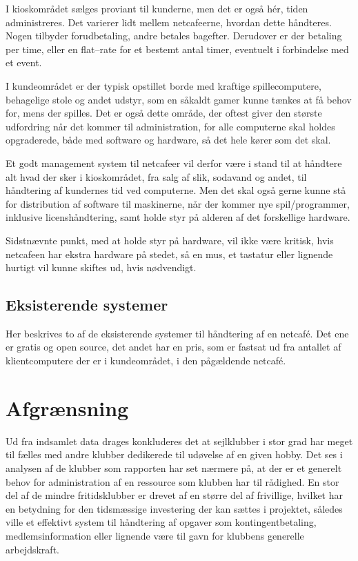 I kioskområdet sælges proviant til kunderne, men det er også hér, tiden administreres. Det varierer lidt
mellem netcafeerne, hvordan dette håndteres. Nogen tilbyder forudbetaling, andre betales bagefter. Derudover
er der betaling per time, eller en flat--rate for et bestemt antal timer, eventuelt i forbindelse med et
event.

I kundeområdet er der typisk opstillet borde med kraftige spillecomputere, behagelige stole og andet udstyr,
som en såkaldt gamer kunne tænkes at få behov for, mens der spilles. Det er også dette område, der oftest
giver den største udfordring når det kommer til administration, for alle computerne skal holdes opgraderede,
både med software og hardware, så det hele kører som det skal.

Et godt management system til netcafeer vil derfor være i stand til at håndtere alt hvad der sker i
kioskområdet, fra salg af slik, sodavand og andet, til håndtering af kundernes tid ved computerne. Men det
skal også gerne kunne stå for distribution af software til maskinerne, når der kommer nye spil/programmer,
inklusive licenshåndtering, samt holde styr på alderen af det forskellige hardware.

Sidstnævnte punkt, med at holde styr på hardware, vil ikke være kritisk, hvis netcafeen har ekstra hardware på
stedet, så en mus, et tastatur eller lignende hurtigt vil kunne skiftes ud, hvis nødvendigt.


\subsection{Eksisterende systemer}\label{sec:eksisterende-systemer}

Her beskrives to af de eksisterende systemer til håndtering af en netcafé. Det ene er gratis og open source, det andet har en pris, som er fastsat ud fra antallet af klientcomputere der er i kundeområdet, i den pågældende netcafé.

\section{Afgrænsning} \label{IntAfgrænsning}
Ud fra indsamlet data drages konkluderes det at sejlklubber i stor grad har meget til fælles med andre klubber dedikerede til udøvelse af en given hobby. Det ses i analysen af de klubber som rapporten har set nærmere på, at der er et generelt behov for administration af en ressource som klubben har til rådighed. En stor del af de mindre fritidsklubber er drevet af en større del af frivillige, hvilket har en betydning for den tidsmæssige investering der kan sættes i projektet, således ville et effektivt system til håndtering af opgaver som kontingentbetaling, medlemsinformation eller lignende være til gavn for klubbens generelle arbejdskraft.

